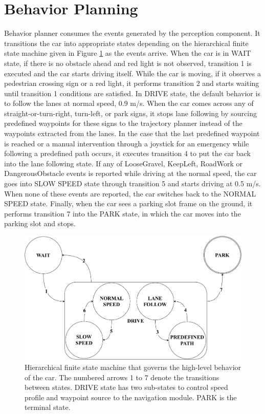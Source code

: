 \section{Behavior Planning}

Behavior planner consumes the events generated by the perception component. It
transitions the car into appropriate states depending on the hierarchical
finite state machine given in Figure \ref{figure:hfsm} as the events arrive.
When the car is in WAIT state, if there is no obstacle ahead and red light is
not observed, transition 1 is executed and the car starts driving itself. While
the car is moving, if it observes a pedestrian crossing sign or a red light, it
performs transition 2 and starts waiting until transition 1 conditions are
satisfied. In DRIVE state, the default behavior is to follow the lanes at
normal speed, 0.9 m/s. When the car comes across any of straight-or-turn-right,
turn-left, or park signs, it stops lane following by sourcing predefined
waypoints for these signs to the trajectory planner instead of the waypoints
extracted from the lanes. In the case that the last predefined waypoint is
reached or a manual intervention through a joystick for an emergency while
following a predefined path occurs, it executes transition 4 to put the car
back into the lane following state. If any of LooseGravel, KeepLeft, RoadWork
or DangerousObstacle events is reported while driving at the normal speed, the
car goes into SLOW SPEED state through transition 5 and starts driving at 0.5
m/s. When none of these events are reported, the car switches back to the
NORMAL SPEED state. Finally, when the car sees a parking slot frame on the
ground, it performs transition 7 into the PARK state, in which the car moves
into the parking slot and stops.

\begin{figure}[h]
\centering
\includegraphics[width=.8\textwidth]{figures/hfsm.pdf}
\caption[Hierarchical finite state machine]{Hierarchical finite state machine
  that governs the high-level behavior of the car. The numbered arrows 1 to 7
  denote the transitions between states. DRIVE state has two sub-states to
  control speed profile and waypoint source to the navigation module. PARK is
  the terminal state.}
\label{figure:hfsm}
\end{figure}
